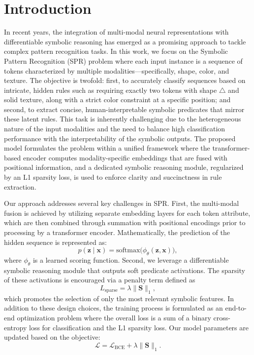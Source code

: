 \documentclass{article}
\begin{document}
\section{Introduction}
In recent years, the integration of multi-modal neural representations with differentiable symbolic reasoning has emerged as a promising approach to tackle complex pattern recognition tasks. In this work, we focus on the Symbolic Pattern Recognition (SPR) problem where each input instance is a sequence of tokens characterized by multiple modalities—specifically, shape, color, and texture. The objective is twofold: first, to accurately classify sequences based on intricate, hidden rules such as requiring exactly two tokens with shape \(\triangle\) and solid texture, along with a strict color constraint at a specific position; and second, to extract concise, human-interpretable symbolic predicates that mirror these latent rules. This task is inherently challenging due to the heterogeneous nature of the input modalities and the need to balance high classification performance with the interpretability of the symbolic outputs. The proposed model formulates the problem within a unified framework where the transformer-based encoder computes modality-specific embeddings that are fused with positional information, and a dedicated symbolic reasoning module, regularized by an L1 sparsity loss, is used to enforce clarity and succinctness in rule extraction.

Our approach addresses several key challenges in SPR. First, the multi-modal fusion is achieved by utilizing separate embedding layers for each token attribute, which are then combined through summation with positional encodings prior to processing by a transformer encoder. Mathematically, the prediction of the hidden sequence is represented as:
\[
p(\mathbf{z}\mid\mathbf{x}) = \mathrm{softmax} \bigl(\phi_\theta(\mathbf{z}, \mathbf{x})\bigr),
\]
where \(\phi_\theta\) is a learned scoring function. Second, we leverage a differentiable symbolic reasoning module that outputs soft predicate activations. The sparsity of these activations is encouraged via a penalty term defined as
\[
L_{\text{sparse}} = \lambda \|\mathbf{S}\|_1,
\]
which promotes the selection of only the most relevant symbolic features. In addition to these design choices, the training process is formulated as an end-to-end optimization problem where the overall loss is a sum of a binary cross-entropy loss for classification and the L1 sparsity loss. Our model parameters are updated based on the objective:
\[
\mathcal{L} = \mathcal{L}_{\text{BCE}} + \lambda \|\mathbf{S}\|_1.
\]
\end{document}
